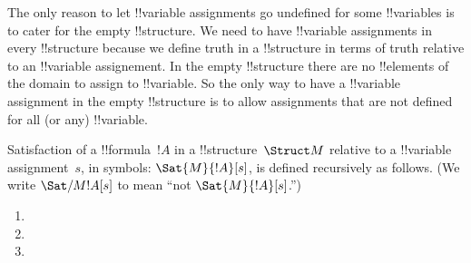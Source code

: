 \documentclass[../../../include/open-logic-section]{subfiles}
\begin{document}
\begin{explain}
The only reason to let !!{variable} assignments go undefined for some
!!{variable}s is to cater  for the empty !!{structure}. We need to have 
!!{variable} assignments in  every !!{structure} because we define 
truth in a !!{structure} in terms of truth relative to an !!{variable} assignement. In the 
empty !!{structure} there are no !!{element}s of the domain to assign 
to !!{variable}. So the only way to have a  !!{variable} assignment 
in the empty !!{structure} is to allow assignments
that are not defined for all (or any) !!{variable}.
\end{explain}

\begin{defn}[Satisfaction]
Satisfaction of a !!{formula}~$!A$ in a !!{structure}~$\Struct M$
relative to a !!{variable} assignment~$s$, in symbols:
$\Sat{M}{!A}[s]$, is defined recursively as follows. (We write
$\Sat/{M}{!A}[s]$ to mean ``not $\Sat{M}{!A}[s]$.'')
\begin{enumerate}


\item {}

\item {}

\item {}







\end{enumerate}
\end{defn}
\end{document}
